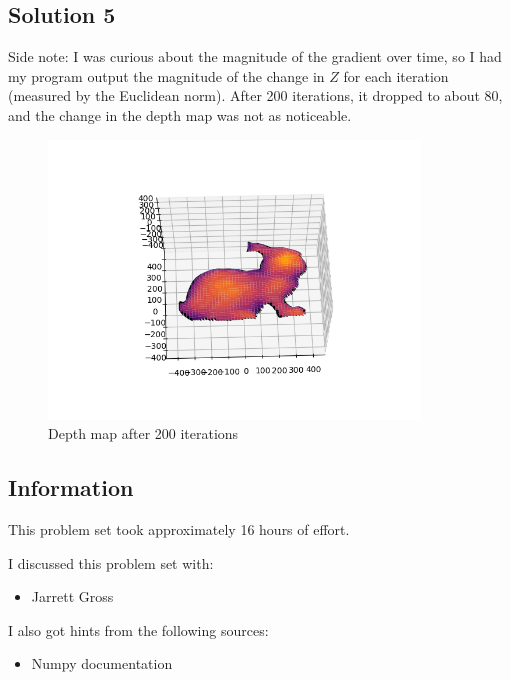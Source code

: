 \documentclass{article}
\newcommand{\info}{\clearpage \subsection*{Information}}
\newcommand{\solution}[1]{\clearpage \subsection*{Solution #1}}
\begin{document}
\solution{5}

Side note: I was curious about the magnitude of the gradient over time, so I had my program output the magnitude of the change in $Z$ for each iteration (measured by the Euclidean norm). After 200 iterations, it dropped to about 80, and the change in the depth map was not as noticeable.

\begin{figure}[!h]
  \centering
  \includegraphics[height=20em]{prob5.png}
  \caption{Depth map after 200 iterations}
\end{figure}


\info

This problem set took approximately 16 hours of effort.


I discussed this problem set with:
\begin{itemize}
\item Jarrett Gross
\end{itemize}


I also got hints from the following sources:
\begin{itemize}
\item Numpy documentation
\end{itemize}
\end{document}
